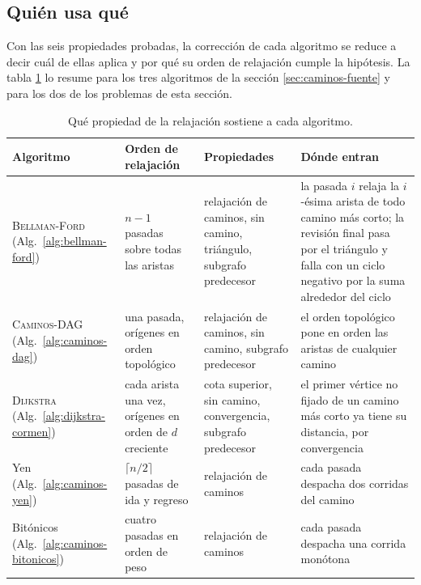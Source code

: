 \documentclass[11pt,letterpaper]{article}
\begin{document}

\subsection*{Quién usa qué}

Con las seis propiedades probadas, la corrección de cada algoritmo se
reduce a decir cuál de ellas aplica y por qué su orden de relajación
cumple la hipótesis. La tabla \ref{tab:caminos-quien-usa} lo resume
para los tres algoritmos de la sección \ref{sec:caminos-fuente} y para
los dos de los problemas de esta sección.

\begin{table}[htbp]
  \centering
  \small
  \begin{tabular}{>{\raggedright\arraybackslash}p{2.6cm}
                  >{\raggedright\arraybackslash}p{3.2cm}
                  >{\raggedright\arraybackslash}p{3.7cm}
                  >{\raggedright\arraybackslash}p{4.9cm}}
    \toprule
    \textbf{Algoritmo} & \textbf{Orden de relajación}
      & \textbf{Propiedades} & \textbf{Dónde entran} \\
    \midrule
    \textsc{Bellman-Ford} (Alg.~\ref{alg:bellman-ford})
      & $n - 1$ pasadas sobre todas las aristas
      & relajación de caminos, sin camino, triángulo, subgrafo
        predecesor
      & la pasada $i$ relaja la $i$-ésima arista de todo camino más
        corto; la revisión final pasa por el triángulo y falla con un
        ciclo negativo por la suma alrededor del ciclo \\
    \addlinespace
    \textsc{Caminos-DAG} (Alg.~\ref{alg:caminos-dag})
      & una pasada, orígenes en orden topológico
      & relajación de caminos, sin camino, subgrafo predecesor
      & el orden topológico pone en orden las aristas de cualquier
        camino \\
    \addlinespace
    \textsc{Dijkstra} (Alg.~\ref{alg:dijkstra-cormen})
      & cada arista una vez, orígenes en orden de $d$ creciente
      & cota superior, sin camino, convergencia, subgrafo predecesor
      & el primer vértice no fijado de un camino más corto ya tiene su
        distancia, por convergencia \\
    \addlinespace
    Yen (Alg.~\ref{alg:caminos-yen})
      & $\lceil n/2 \rceil$ pasadas de ida y regreso
      & relajación de caminos
      & cada pasada despacha dos corridas del camino \\
    \addlinespace
    Bitónicos (Alg.~\ref{alg:caminos-bitonicos})
      & cuatro pasadas en orden de peso
      & relajación de caminos
      & cada pasada despacha una corrida monótona \\
    \bottomrule
  \end{tabular}
  \caption{Qué propiedad de la relajación sostiene a cada algoritmo.}
  \label{tab:caminos-quien-usa}
\end{table}
\end{document}

